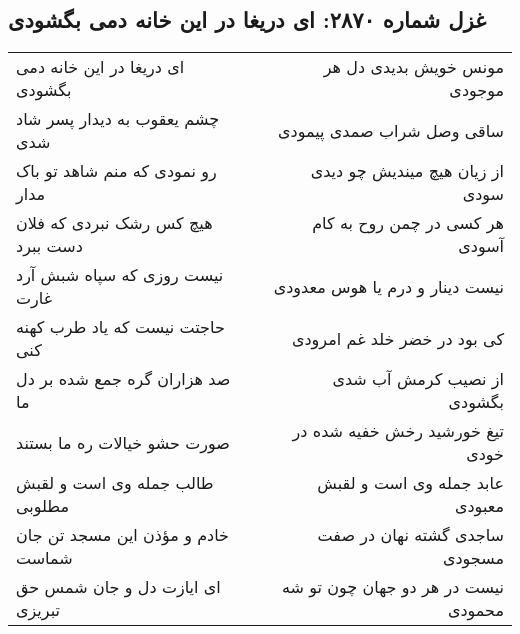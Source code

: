 \begin{center}
\section*{غزل شماره ۲۸۷۰: ای دریغا در این خانه دمی بگشودی}
\label{sec:2870}
\begin{longtable}{l p{0.5cm} r}
ای دریغا در این خانه دمی بگشودی
&&
مونس خویش بدیدی دل هر موجودی
\\
چشم یعقوب به دیدار پسر شاد شدی
&&
ساقی وصل شراب صمدی پیمودی
\\
رو نمودی که منم شاهد تو باک مدار
&&
از زیان هیچ میندیش چو دیدی سودی
\\
هیچ کس رشک نبردی که فلان دست ببرد
&&
هر کسی در چمن روح به کام آسودی
\\
نیست روزی که سپاه شبش آرد غارت
&&
نیست دینار و درم یا هوس معدودی
\\
حاجتت نیست که یاد طرب کهنه کنی
&&
کی بود در خضر خلد غم امرودی
\\
صد هزاران گره جمع شده بر دل ما
&&
از نصیب کرمش آب شدی بگشودی
\\
صورت حشو خیالات ره ما بستند
&&
تیغ خورشید رخش خفیه شده در خودی
\\
طالب جمله وی است و لقبش مطلوبی
&&
عابد جمله وی است و لقبش معبودی
\\
خادم و مؤذن این مسجد تن جان شماست
&&
ساجدی گشته نهان در صفت مسجودی
\\
ای ایازت دل و جان شمس حق تبریزی
&&
نیست در هر دو جهان چون تو شه محمودی
\\
\end{longtable}
\end{center}
